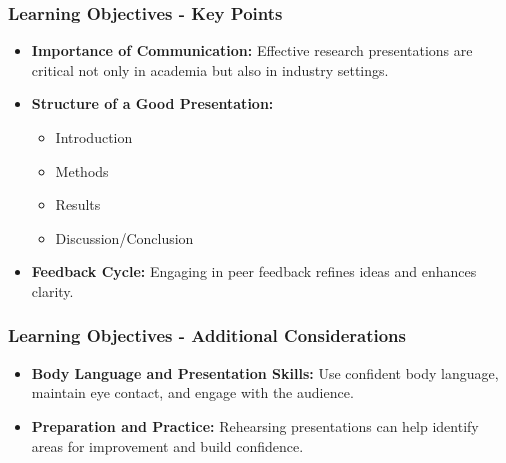 \documentclass[aspectratio=169]{beamer}
\begin{document}
\begin{frame}[fragile]
    \frametitle{Learning Objectives - Key Points}
    \begin{itemize}
        \item \textbf{Importance of Communication:} Effective research presentations are critical not only in academia but also in industry settings.
        \item \textbf{Structure of a Good Presentation:}
            \begin{itemize}
                \item Introduction
                \item Methods
                \item Results
                \item Discussion/Conclusion
            \end{itemize}
        \item \textbf{Feedback Cycle:} Engaging in peer feedback refines ideas and enhances clarity.
    \end{itemize}
\end{frame}

\begin{frame}[fragile]
    \frametitle{Learning Objectives - Additional Considerations}
    \begin{itemize}
        \item \textbf{Body Language and Presentation Skills:} Use confident body language, maintain eye contact, and engage with the audience.
        \item \textbf{Preparation and Practice:} Rehearsing presentations can help identify areas for improvement and build confidence.
    \end{itemize}
\end{frame}
\end{document}
